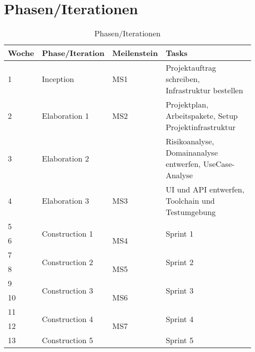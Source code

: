 \section*{Phasen/Iterationen}

\begin{table}[H]
    \centering
    \caption{Phasen/Iterationen}
    \label{phases}
    \begin{tabular}{| l | l | l | l |}
        \toprule
        Woche & Phase/Iteration                 & Meilenstein & Tasks                                                     \\
        \midrule
        1     & Inception                       & MS1         & Projektauftrag schreiben, Infrastruktur bestellen       \\
        2     & Elaboration 1                   & MS2         & Projektplan, Arbeitspakete, Setup Projektinfrastruktur  \\
        3     & Elaboration 2                   &             & Risikoanalyse, Domainanalyse entwerfen, UseCase-Analyse \\
        4     & Elaboration 3                   & MS3         & UI und API entwerfen, Toolchain und Testumgebung        \\
        5     & \multirow{2}{*}{Construction 1} &             & \multirow{2}{*}{Sprint 1}                               \\
        6     &                                 & MS4         &                                                         \\
        7     & \multirow{2}{*}{Construction 2} &             & \multirow{2}{*}{Sprint 2}                               \\
        8     &                                 & MS5         &                                                         \\
        9     & \multirow{2}{*}{Construction 3} &             & \multirow{2}{*}{Sprint 3}                               \\
        10    &                                 & MS6         &                                                         \\
        11    & \multirow{2}{*}{Construction 4} &             & \multirow{2}{*}{Sprint 4}                               \\
        12    &                                 & MS7         &                                                         \\
        13    & \multirow{2}{*}{Construction 5} &             & Sprint 5                                                \\

\end{tabular}
\end{table}
